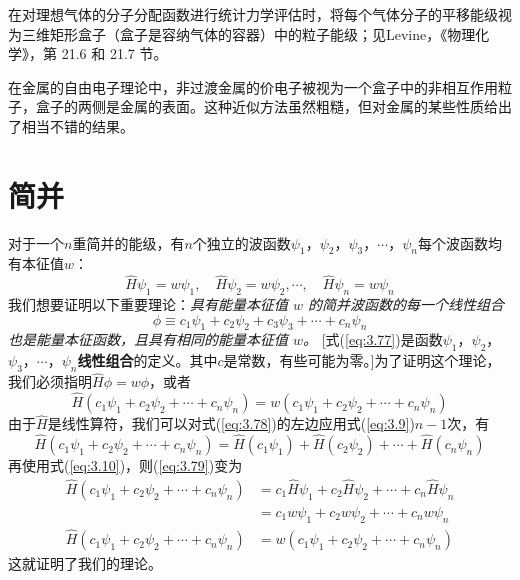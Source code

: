 	在对理想气体的分子分配函数进行统计力学评估时，将每个气体分子的平移能级视为三维矩形盒子（盒子是容纳气体的容器）中的粒子能级；见Levine，《物理化学》，第 21.6 和 21.7 节。

	在金属的自由电子理论中，非过渡金属的价电子被视为一个盒子中的非相互作用粒子，盒子的两侧是金属的表面。这种近似方法虽然粗糙，但对金属的某些性质给出了相当不错的结果。
	
\section{简并}
\label{sec:3.6 Degeneracy}
	对于一个$n$重简并的能级，有$n$个独立的波函数$\psi_1$，$\psi_2$，$\psi_3$，$\cdots$，$\psi_n$每个波函数均有本征值$w$：
	\begin{equation}
		\hat{H}\psi_1 = w\psi_1, \quad\hat{H}\psi_2 = w\psi_2, \cdots,\quad \hat{H}\psi_n = w\psi_n
		\label{eq:3.76}
	\end{equation}
	我们想要证明以下重要理论：\textit{具有能量本征值 $w$ 的简并波函数的每一个线性组合}
	\begin{equation}
		\phi \equiv c_1\psi_1 + c_2\psi_2 + c_3\psi_3 + \cdots + c_n\psi_n
		\label{eq:3.77}
	\end{equation}
	\textit{也是能量本征函数，且具有相同的能量本征值 $w$。} [式(\ref{eq:3.77})是函数$\psi_1$，$\psi_2$，$\psi_3$，$\cdots$，$\psi_n$\textbf{线性组合}的定义。其中$c$是常数，有些可能为零。]为了证明这个理论，我们必须指明$\hat{H}\phi = w\phi$，或者
	\begin{equation}
		\hat{H}\left(c_1\psi_1 + c_2\psi_2 +  \cdots + c_n\psi_n\right) = w\left(c_1\psi_1 + c_2\psi_2 + \cdots + c_n\psi_n\right)
		\label{eq:3.78}
	\end{equation}	
	由于$\hat{H}$是线性算符，我们可以对式(\ref{eq:3.78})的左边应用式(\ref{eq:3.9})$n-1$次，有
	\begin{equation*}
		\hat{H}\left(c_1\psi_1 + c_2\psi_2 +  \cdots + c_n\psi_n\right) = \hat{H}\left(c_1\psi_1\right) + \hat{H}\left(c_2\psi_2\right) + \cdots + \hat{H}\left(c_n\psi_n\right)
	\end{equation*}
	再使用式(\ref{eq:3.10})，则(\ref{eq:3.79})变为
	\begin{equation*}
		\begin{aligned}
			\hat{H}\left(c_1\psi_1 + c_2\psi_2 +  \cdots + c_n\psi_n\right) &= c_1\hat{H}\psi_1 + c_2\hat{H}\psi_2 +  \cdots + c_n\hat{H}\psi_n \\
			&= c_1w\psi_1 + c_2w\psi_2 +  \cdots + c_nw\psi_n \\
			\hat{H}\left(c_1\psi_1 + c_2\psi_2 +  \cdots + c_n\psi_n\right) &= w\left(c_1\psi_1 + c_2\psi_2 +  \cdots + c_n\psi_n\right)
		\end{aligned}
	\end{equation*}
	这就证明了我们的理论。


